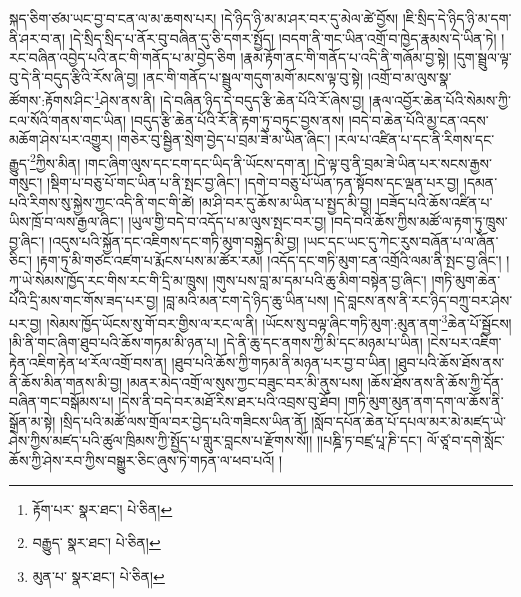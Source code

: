 སྐད་ཅིག་ཙམ་ཡང་བྱ་བ་ངན་ལ་མ་ཆགས་པར། །དེ་ཉིད་ཉི་མ་མ་ཤར་བར་དུ་མེལ་ཚེ་བྱོས། །ཇི་སྲིད་དེ་ཉིད་ཉི་མ་དག་ནི་ཤར་བ་ན། །དེ་སྲིད་སྲིད་པ་ནོར་བུ་བཞིན་དུ་ཅི་དགར་སྤྱོད། །བདག་ནི་གང་ཡིན་འགྲོ་བ་ཁྱེད་རྣམས་དེ་ཡིན་ཏེ། །རང་བཞིན་འབྱེད་པའི་ནང་གི་གནོད་པ་མ་བྱེད་ཅིག །རྣམ་རྟོག་ནང་གི་གནོད་པ་འདི་ནི་གཞོམ་བྱ་སྟེ། །དུག་སྦྲུལ་ལྟ་བུ་དེ་ནི་བདུད་རྩིའི་རོས་ཞི་བྱ། །ནང་གི་གནོད་པ་སྦྲུལ་གདུག་མགོ་མངས་ལྟ་བུ་སྟེ། །འགྲོ་བ་མ་ལུས་སྣ་ཚོགས་:རྟོགས་ཤིང་\footnote{རྟོག་པར་  སྣར་ཐང་།  པེ་ཅིན། }ཤེས་ནས་ནི། །དེ་བཞིན་ཉིད་དེ་བདུད་རྩི་ཆེན་པོའི་རོ་ཞེས་བྱ། །རྣལ་འབྱོར་ཆེན་པོའི་སེམས་ཀྱི་ངལ་སོའི་གནས་གང་ཡིན། །བདུད་རྩི་ཆེན་པོའི་རོ་ནི་རྟག་ཏུ་བཏུང་བྱས་ནས། །བདེ་བ་ཆེན་པོའི་མྱ་ངན་འདས་མཆོག་ཤེས་པར་འགྱུར། །གཅེར་བུ་སྦྱིན་སྲེག་བྱེད་པ་བྲམ་ཟེ་མ་ཡིན་ཞིང་། །རལ་པ་འཛིན་པ་དང་ནི་རིགས་དང་རྒྱུད་\footnote{བརྒྱུད་  སྣར་ཐང་།  པེ་ཅིན། }ཀྱིས་མིན། །གང་ཞིག་ལུས་དང་ངག་དང་ཡིད་ནི་ཡོངས་དག་ན། །དེ་ལྟ་བུ་ནི་བྲམ་ཟེ་ཡིན་པར་སངས་རྒྱས་གསུང་། །སྡིག་པ་བཅུ་པོ་གང་ཡིན་པ་ནི་སྤང་བྱ་ཞིང་། །དགེ་བ་བཅུ་པོ་ཡོན་ཏན་སྟོབས་དང་ལྡན་པར་བྱ། །དམན་པའི་རིགས་སུ་སྐྱེས་ཀྱང་འདི་ནི་གང་གི་ཚེ། །མ་ཤི་བར་དུ་ཆོས་མ་ཡིན་པ་སྤྱད་མི་བྱ། །བཟོད་པའི་ཆོས་འཛིན་པ་ཡིས་ཁྲོ་བ་ལས་རྒྱལ་ཞིང་། །ཡུལ་གྱི་བདེ་བ་འདོད་པ་མ་ལུས་སྤང་བར་བྱ། །བདེ་བའི་ཆོས་ཀྱིས་མཚོ་ལ་རྟག་ཏུ་ཁྲུས་བྱ་ཞིང་། །འདུས་པའི་སྐྱོན་དང་འཇིགས་དང་གཏི་མུག་བསྐྱེད་མི་བྱ། །ཡང་དང་ཡང་དུ་ཀེང་རུས་བཞོན་པ་ལ་ཞོན་ཅིང་། །རྟག་ཏུ་མི་གཙང་འཛག་པ་རྨོངས་པས་མ་ཚོར་རམ། །འདོད་དང་གཏི་མུག་ངན་འགྲོའི་ལམ་ནི་སྤང་བྱ་ཞིང་། །ཀྭ་ཡེ་སེམས་ཁྱོད་རང་གིས་རང་གི་དྲི་མ་ཁྲུས། །གུས་པས་བླ་མ་དམ་པའི་ཆུ་མིག་བསྟེན་བྱ་ཞིང་། །གཏི་མུག་ཆེན་པོའི་དྲི་མས་གང་གོས་ཟད་པར་བྱ། །བླ་མའི་མན་ངག་དེ་ཉིད་ཆུ་ཡིན་པས། །དེ་བླངས་ནས་ནི་རང་ཉིད་བཀྲུ་བར་ཤེས་པར་བྱ། །སེམས་ཁྱོད་ཡོངས་སུ་གོ་བར་གྱིས་ལ་རང་ལ་ནི། །ཡོངས་སུ་བལྟ་ཞིང་གཏི་མུག་:མུན་ནག་\footnote{མུན་པ་  སྣར་ཐང་།  པེ་ཅིན། }ཆེན་པོ་སྦྱོངས། །མི་ནི་གང་ཞིག་ཐུབ་པའི་ཆོས་གཏམ་མི་ཉན་པ། །དེ་ནི་ཆུ་དང་ནགས་ཀྱི་མི་དང་མཉམ་པ་ཡིན། །ངེས་པར་འཇིག་རྟེན་འཇིག་རྟེན་ཕ་རོལ་འགྲོ་བས་ན། །ཐུབ་པའི་ཆོས་ཀྱི་གཏམ་ནི་མཉན་པར་བྱ་བ་ཡིན། །ཐུབ་པའི་ཆོས་ཐོས་ནས་ནི་ཆོས་མིན་གནས་མི་བྱ། །མནར་མེད་འགྲོ་ལ་སུས་ཀྱང་བཟུང་བར་མི་ནུས་པས། །ཆོས་ཐོས་ནས་ནི་ཆོས་ཀྱི་དོན་བཞིན་གང་བསྒོམས་པ། །དེས་ནི་བདེ་བར་མཐོ་རིས་ཐར་པའི་འབྲས་བུ་ཐོབ། །གཏི་མུག་མུན་ནག་དག་ལ་ཆོས་ནི་སྒྲོན་མ་སྟེ། །སྲིད་པའི་མཚོ་ལས་གྲོལ་བར་བྱེད་པའི་གཟིངས་ཡིན་ནོ། །སློབ་དཔོན་ཆེན་པོ་དཔལ་མར་མེ་མཛད་ཡེ་ཤེས་ཀྱིས་མཛད་པའི་ཚུལ་ཁྲིམས་ཀྱི་སྤྱོད་པ་གླུར་བླངས་པ་རྫོགས་སོ།། །།པཎྜི་ཏ་བཛྲ་པཱ་ཎི་དང་། ལོ་ཙཱ་བ་དགེ་སློང་ཆོས་ཀྱི་ཤེས་རབ་ཀྱིས་བསྒྱུར་ཅིང་ཞུས་ཏེ་གཏན་ལ་ཕབ་པའོ། ། 